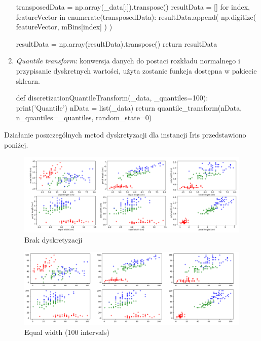 \documentclass[12pt,a4paper]{article}
\begin{document}
\begin{enumerate}
\begin{python}
    transposedData = np.array(_data[:]).transpose()
    resultData = []
    for index, featureVector in enumerate(transposedData):
        resultData.append(
            np.digitize(
                featureVector,
                mBins[index]
            )
        )

    resultData = np.array(resultData).transpose()
    return resultData
\end{python}

\item \emph{Quantile transform}: konwersja danych do postaci rozkładu normalnego i przypisanie dyskretnych wartości, użyta zostanie funkcja dostępna w pakiecie sklearn.
\begin{python}
def discretizationQuantileTransform(_data, _quantiles=100):
    print('Quantile')
    nData = list(_data)
    return quantile_transform(nData, n_quantiles=_quantiles, random_state=0) 
\end{python}
\end{enumerate}

Działanie poszczególnych metod dyskretyzacji dla instancji Iris przedstawiono poniżej.

\begin{figure}[H]
\centering
\includegraphics[width=1\textwidth]{discretization_none.PNG}
\caption{Brak dyskretyzacji}
\end{figure}

\begin{figure}[H]
\centering
\includegraphics[width=1\textwidth]{discretization_equalWidth.PNG}
\caption{Equal width (100 intervals)}
\end{figure}
\end{document}

